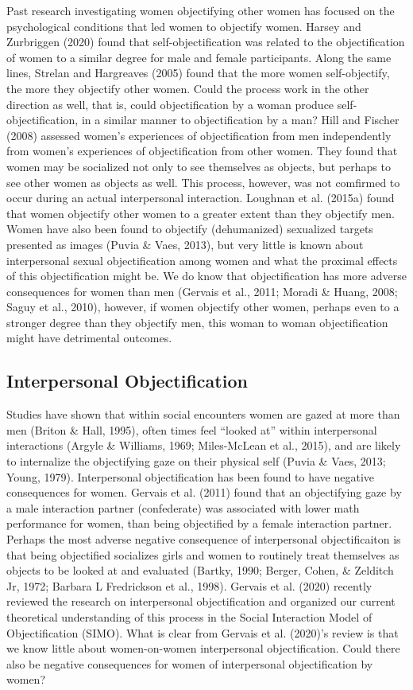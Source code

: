 \documentclass[man]{apa6}
\begin{document}
Past research investigating women objectifying other women has focused
on the psychological conditions that led women to objectify women.
Harsey and Zurbriggen (2020) found that self-objectification was related
to the objectification of women to a similar degree for male and female
participants. Along the same lines, Strelan and Hargreaves (2005) found
that the more women self-objectify, the more they objectify other women.
Could the process work in the other direction as well, that is, could
objectification by a woman produce self-objectification, in a similar
manner to objectification by a man? Hill and Fischer (2008) assessed
women's experiences of objectification from men independently from
women's experiences of objectification from other women. They found that
women may be socialized not only to see themselves as objects, but
perhaps to see other women as objects as well. This process, however,
was not comfirmed to occur during an actual interpersonal interaction.
Loughnan et al. (2015a) found that women objectify other women to a
greater extent than they objectify men. Women have also been found to
objectify (dehumanized) sexualized targets presented as images (Puvia \&
Vaes, 2013), but very little is known about interpersonal sexual
objectification among women and what the proximal effects of this
objectification might be. We do know that objectification has more
adverse consequences for women than men (Gervais et al., 2011; Moradi \&
Huang, 2008; Saguy et al., 2010), however, if women objectify other
women, perhaps even to a stronger degree than they objectify men, this
woman to woman objectification might have detrimental outcomes.

\subsection{Interpersonal
Objectification}\label{interpersonal-objectification}

Studies have shown that within social encounters women are gazed at more
than men (Briton \& Hall, 1995), often times feel \enquote{looked at}
within interpersonal interactions (Argyle \& Williams, 1969;
Miles-McLean et al., 2015), and are likely to internalize the
objectifying gaze on their physical self (Puvia \& Vaes, 2013; Young,
1979). Interpersonal objectification has been found to have negative
consequences for women. Gervais et al. (2011) found that an objectifying
gaze by a male interaction partner (confederate) was associated with
lower math performance for women, than being objectified by a female
interaction partner. Perhaps the most adverse negative consequence of
interpersonal objectificaiton is that being objectified socializes girls
and women to routinely treat themselves as objects to be looked at and
evaluated (Bartky, 1990; Berger, Cohen, \& Zelditch Jr, 1972; Barbara L
Fredrickson et al., 1998). Gervais et al. (2020) recently reviewed the
research on interpersonal objectification and organized our current
theoretical understanding of this process in the Social Interaction
Model of Objectification (SIMO). What is clear from Gervais et al.
(2020)'s review is that we know little about women-on-women
interpersonal objectification. Could there also be negative consequences
for women of interpersonal objectification by women?
\end{document}
